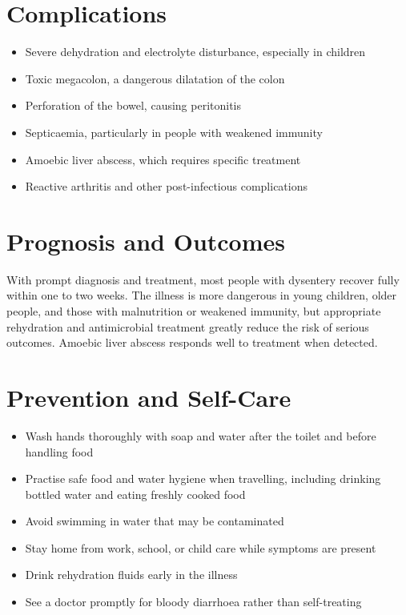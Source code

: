 \section*{Complications}
\begin{itemize}
    \item Severe dehydration and electrolyte disturbance, especially in children
    \item Toxic megacolon, a dangerous dilatation of the colon
    \item Perforation of the bowel, causing peritonitis
    \item Septicaemia, particularly in people with weakened immunity
    \item Amoebic liver abscess, which requires specific treatment
    \item Reactive arthritis and other post-infectious complications
\end{itemize}

\section*{Prognosis and Outcomes}
With prompt diagnosis and treatment, most people with dysentery recover fully within one to two weeks. The illness is more dangerous in young children, older people, and those with malnutrition or weakened immunity, but appropriate rehydration and antimicrobial treatment greatly reduce the risk of serious outcomes. Amoebic liver abscess responds well to treatment when detected.

\section*{Prevention and Self-Care}
\begin{itemize}
    \item Wash hands thoroughly with soap and water after the toilet and before handling food
    \item Practise safe food and water hygiene when travelling, including drinking bottled water and eating freshly cooked food
    \item Avoid swimming in water that may be contaminated
    \item Stay home from work, school, or child care while symptoms are present
    \item Drink rehydration fluids early in the illness
    \item See a doctor promptly for bloody diarrhoea rather than self-treating
\end{itemize}

